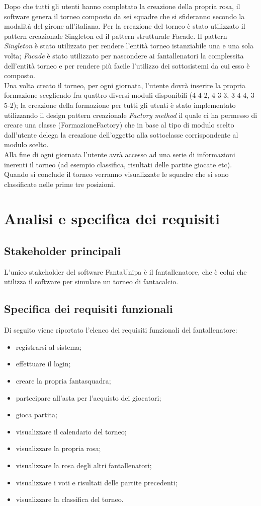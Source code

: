 \documentclass[12pt,a4paper]{article}
\begin{document}
Dopo che tutti gli utenti hanno completato la creazione della propria rosa, il software genera il torneo composto da sei squadre che si sfideranno secondo la modalità del girone all'italiana. Per la creazione del torneo è stato utilizzato il pattern creazionale Singleton ed il pattern strutturale Facade. Il pattern \textit{Singleton} è stato utilizzato per rendere l'entità torneo istanziabile una e una sola volta; \textit{Facade} è stato utilizzato per nascondere ai fantallenatori la  complessita dell'entità torneo e per rendere più facile l'utilizzo dei sottosistemi da cui esso è composto.\\
Una volta creato il torneo, per ogni giornata, l'utente dovrà inserire la propria formazione scegliendo fra quattro diversi moduli disponibili (4-4-2, 4-3-3, 3-4-4, 3-5-2); la creazione della formazione per tutti gli utenti è stato implementato utilizzando il design pattern creazionale \textit{Factory method} il quale ci ha permesso di creare una classe (FormazioneFactory) che in base al tipo di modulo scelto dall'utente delega la creazione dell'oggetto alla sottoclasse corrispondente al modulo scelto.\\
Alla fine di ogni giornata l'utente avrà accesso ad una serie di informazioni inerenti il torneo (ad esempio classifica, risultati delle partite giocate etc).\\ Quando si conclude il torneo verranno visualizzate le squadre che si sono classificate nelle prime tre posizioni.
\section{Analisi e specifica dei requisiti}
\subsection{Stakeholder principali}
L'unico stakeholder del software FantaUnipa è il fantallenatore, che è colui che utilizza il software per simulare un torneo di fantacalcio. 
\subsection{Specifica dei requisiti funzionali}
Di seguito viene riportato l'elenco dei requisiti funzionali del fantallenatore:
\begin{itemize}
\item registrarsi al sistema;
\item effettuare il login;
\item creare la propria fantasquadra;
\item partecipare all'asta per l'acquisto dei giocatori;
\item gioca partita;
\item visualizzare il calendario del torneo;
\item visualizzare la propria rosa;
\item visualizzare la rosa degli altri fantallenatori;
\item visualizzare i voti e risultati delle partite precedenti;
\item visualizzare la classifica del torneo.
\end{itemize}
\end{document}
